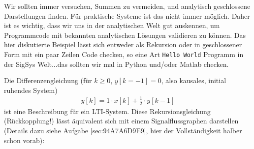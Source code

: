 \begin{ExCalc}
Wir sollten immer versuchen, Summen zu vermeiden, und analytisch geschlossene
Darstellungen finden. Für praktische Systeme ist das nicht immer möglich.
Daher ist es wichtig, dass wir uns in der analytischen Welt gut auskennen, um
Programmcode mit bekannten analytischen Lösungen validieren zu können.
%
Das hier diskutierte Beispiel lässt sich entweder als Rekursion oder in geschlossener
Form mit ein paar Zeilen Code checken, so eine Art \texttt{Hello World} Programm
in der SigSys Welt...das sollten wir mal in Python und/oder Matlab checken.
\end{ExCalc}
\begin{Loesung}
Die Differenzengleichung (für $k\geq 0$, $y[k=-1]=0$, also kausales, initial ruhendes System)
\begin{align}
y[k] = 1 \cdot x[k] + \frac{1}{2} \cdot y[k-1]
\end{align}
ist eine Beschreibung für ein LTI-System. Diese Rekursionsgleichung (Rückkopplung!)
lässt äquivalent sich mit einem Signalflussgraphen darstellen
(Details dazu siehe Aufgabe \ref{sec:94A7A6D9E9}, hier der Vollständigkeit halber
schon vorab):
%
\begin{center}
\end{center}
%


\end{Loesung}

